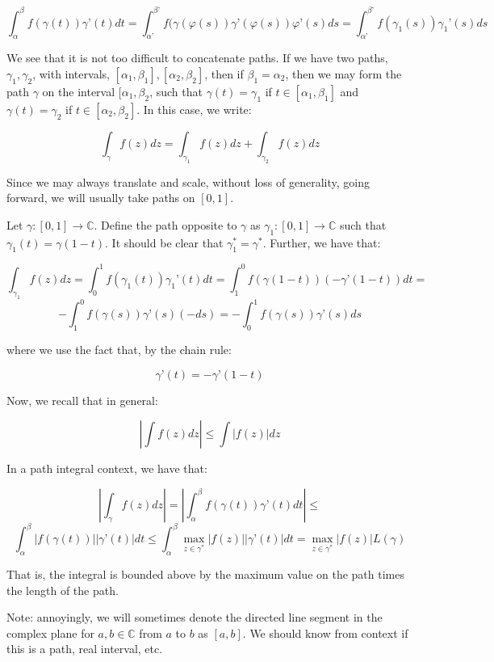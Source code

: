 \documentclass[10pt]{article}
\begin{document}
$$\int_\alpha^\beta f(\gamma(t)) \gamma’(t) dt = \int_{\alpha’}^{\beta’} f(\gamma(\varphi(s)) \gamma’(\varphi(s)) \varphi’(s) ds =  \int_{\alpha’}^{\beta’} f(\gamma_1(s)) \gamma_1’(s) ds $$

We see that it is not too difficult to concatenate paths. If we have two paths, $\gamma_1, \gamma_2$, with intervals, $[\alpha_1,\beta_1], [\alpha_2, \beta_2]$, then if $\beta_1 = \alpha_2$, then we may form the path $\gamma$ on the interval $[\alpha_1, \beta_2$, such that $\gamma(t) = \gamma_1$ if $t \in [\alpha_1, \beta_1]$ and $\gamma(t) = \gamma_2$ if $t \in [\alpha_2, \beta_2]$. In this case, we write:

$$ \int_\gamma f(z) dz  = \int_{\gamma_1} f(z) dz + \int_{\gamma_2} f(z) dz $$

Since we may always translate and scale, without loss of generality, going forward, we will usually take paths on $[0,1]$. 

Let $\gamma: [0,1] \to \mathbb{C}$. Define the path opposite to $\gamma$ as $\gamma_1: [0,1] \to \mathbb{C}$ such that $\gamma_1(t) = \gamma(1-t)$. It should be clear that $\gamma_1^* = \gamma^*$. Further, we have that:

$$ \int_{\gamma_1} f(z) dz = \int_0^1 f(\gamma_1(t)) \gamma_1’(t) dt = \int_1^0 f(\gamma(1-t)) \left(-\gamma’(1-t)\right) dt =  $$
$$  - \int_1^0 f(\gamma(s)) \gamma’(s)(-ds) = - \int_0^1 f(\gamma(s)) \gamma’(s) ds $$

where we use the fact that, by the chain rule:

$$ \gamma’(t) = -\gamma’(1-t)$$

Now, we recall that in general:

$$ \left| \int f(z) dz \right| \leq \int | f(z) | dz $$

In a path integral context, we have that:

$$ \left| \int_\gamma f(z) dz \right|  = \left| \int_\alpha^\beta f(\gamma(t)) \gamma’(t) dt \right| \leq $$
$$ \int_\alpha^\beta |f(\gamma(t))| |\gamma’(t)| dt \leq \int_\alpha^\beta \max_{z \in \gamma^*} |f(z)| |\gamma’(t)| dt =  \max_{z \in \gamma^*} |f(z)| L(\gamma)  $$

That is, the integral is bounded above by the maximum value on the path times the length of the path.

Note: annoyingly, we will sometimes denote the directed line segment in the complex plane for $a,b \in \mathbb{C}$ from $a$ to $b$ as $[a,b]$. We should know from context if this is a path, real interval, etc.
\end{document}
